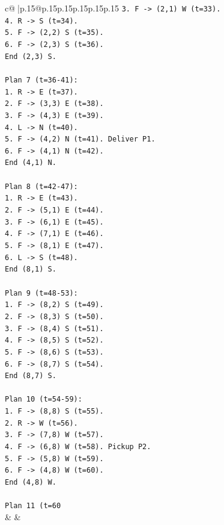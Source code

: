 \documentclass{article}
\begin{document}
{\begin{supertabular}{c@{$\;$}|p{.15\linewidth}@{}p{.15\linewidth}p{.15\linewidth}p{.15\linewidth}p{.15\linewidth}p{.15\linewidth}}
{{{\texttt{3. F {-}> (2,1) W (t=33).} \\
\texttt{4. R {-}> S (t=34).} \\
\texttt{5. F {-}> (2,2) S (t=35).} \\
\texttt{6. F {-}> (2,3) S (t=36).} \\
\texttt{End (2,3) S.} \\
\\ 
\texttt{Plan 7 (t=36{-}41):} \\
\texttt{1. R {-}> E (t=37).} \\
\texttt{2. F {-}> (3,3) E (t=38).} \\
\texttt{3. F {-}> (4,3) E (t=39).} \\
\texttt{4. L {-}> N (t=40).} \\
\texttt{5. F {-}> (4,2) N (t=41). Deliver P1.} \\
\texttt{6. F {-}> (4,1) N (t=42).} \\
\texttt{End (4,1) N.} \\
\\ 
\texttt{Plan 8 (t=42{-}47):} \\
\texttt{1. R {-}> E (t=43).} \\
\texttt{2. F {-}> (5,1) E (t=44).} \\
\texttt{3. F {-}> (6,1) E (t=45).} \\
\texttt{4. F {-}> (7,1) E (t=46).} \\
\texttt{5. F {-}> (8,1) E (t=47).} \\
\texttt{6. L {-}> S (t=48).} \\
\texttt{End (8,1) S.} \\
\\ 
\texttt{Plan 9 (t=48{-}53):} \\
\texttt{1. F {-}> (8,2) S (t=49).} \\
\texttt{2. F {-}> (8,3) S (t=50).} \\
\texttt{3. F {-}> (8,4) S (t=51).} \\
\texttt{4. F {-}> (8,5) S (t=52).} \\
\texttt{5. F {-}> (8,6) S (t=53).} \\
\texttt{6. F {-}> (8,7) S (t=54).} \\
\texttt{End (8,7) S.} \\
\\ 
\texttt{Plan 10 (t=54{-}59):} \\
\texttt{1. F {-}> (8,8) S (t=55).} \\
\texttt{2. R {-}> W (t=56).} \\
\texttt{3. F {-}> (7,8) W (t=57).} \\
\texttt{4. F {-}> (6,8) W (t=58). Pickup P2.} \\
\texttt{5. F {-}> (5,8) W (t=59).} \\
\texttt{6. F {-}> (4,8) W (t=60).} \\
\texttt{End (4,8) W.} \\
\\ 
\texttt{Plan 11 (t=60} \\
            }
        }
    }
    & & \\ \\


\end{supertabular}}
\end{document}
